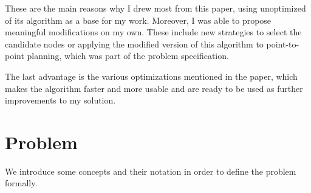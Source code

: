 \documentclass{ctuthesis}
\begin{document}
These are the main reasons why I drew most from this paper, using unoptimized of its algorithm as a base for my work. Moreover, I was able to propose meaningful modifications on my own. These include new strategies to select the candidate nodes or applying the modified version of this algorithm to point-to-point planning, which was part of the problem specification. \par
The last advantage is the various optimizations mentioned in the paper, which makes the algorithm faster and more usable and are ready to be used as further improvements to my solution. \par





\chapter{Problem}
We introduce some concepts and their notation in order to define the problem formally. \par
\end{document}
